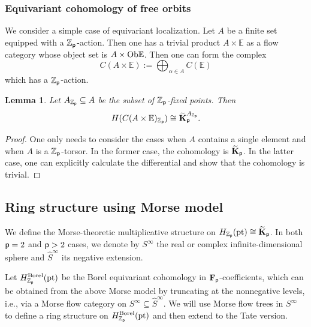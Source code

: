 \documentclass[reqno, 10pt]{amsart}
\numberwithin{equation}{section}
\numberwithin{equation}{section}
\renewcommand{\subset}{\subseteq}
\newtheorem{lemma}[thm]{Lemma}
\theoremstyle{definition}
\theoremstyle{remark}
\newcommand{\beqn}{\begin{equation*}}
\newcommand{\eeqn}{\end{equation*}}
\newcommand{\mb}{\mathbb}
\newcommand{\p}{{\sf p}}
\newcommand{\fp}{{\bf F}_{\sf p}}
\newcommand{\tkp}{\wt{\bf K}_{\sf p}}
\newcommand{\zp}{{{\mb Z}_{\sf p}}}
\newcommand{\wt}{\widetilde}
\newcommand{\wh}{\widehat}
\begin{document}
\subsubsection{Equivariant cohomology of free orbits}

We consider a simple case of equivariant localization. Let $A$ be a finite set equipped with a $\zp$-action. Then one has a trivial product $A \times {\mb E}$ as a flow category whose object set is $A \times {\rm Ob}{\mb E}$. Then one can form the complex
\beqn
C(A \times {\mb E}):= \bigoplus_{\alpha \in A} C({\mb E})
\eeqn
which has a $\zp$-action. 

\begin{lemma}\label{lemma_localization}
Let $A_{\zp} \subset A$ be the subset of $\zp$-fixed points. Then 
\beqn
H(C(A \times {\mb E})_{\zp}) \cong \tkp^{A_{\zp}}.
\eeqn
\end{lemma}

\begin{proof}
One only needs to consider the cases when $A$ contains a single element and when $A$ is a $\zp$-torsor. In the former case, the cohomology is $\tkp$. In the latter case, one can explicitly calculate the differential and show that the cohomology is trivial.
\end{proof}





\subsection{Ring structure using Morse model}

We define the Morse-theoretic multiplicative structure on $H_{\zp} ({\rm pt}) \cong \tkp$. In both $\p= 2$ and $\p>2$ cases, we denote by $S^\infty$ the real or complex infinite-dimensional sphere and $\wh S^\infty$ its negative extension.

Let $H_{\zp}^{\rm Borel}({\rm pt})$ be the Borel equivariant cohomology in $\fp$-coefficients, which can be obtained from the above Morse model by truncating at the nonnegative levels, i.e., via a Morse flow category on $S^\infty \subset \wh S^\infty$. We will use Morse flow trees in $S^\infty$ to define a ring structure on $H_{\zp}^{\rm Borel}({\rm pt})$ and then extend to the Tate version. 
\end{document}
